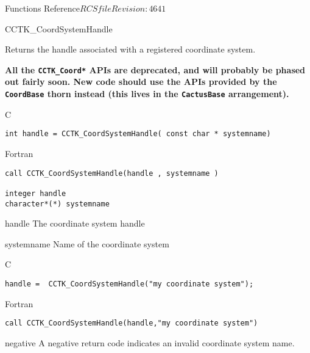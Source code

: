 \begin{cactuspart}{ Functions Reference}{$RCSfile$}{$Revision: 4641 $}
\begin{FunctionDescription}{CCTK\_CoordSystemHandle}%
{Returns the handle associated with a registered coordinate system.

\textbf{All the \texttt{CCTK\_Coord*} APIs are deprecated,
and will probably be phased out fairly soon.
New code should use the APIs provided by the \texttt{CoordBase} thorn
instead (this lives in the \texttt{CactusBase} arrangement).}
}
\label{CCTK-CoordSystemHandle}
\begin{SynopsisSection}
\begin{Synopsis}{C}
\begin{verbatim}int handle = CCTK_CoordSystemHandle( const char * systemname)\end{verbatim}
\end{Synopsis}
\begin{Synopsis}{Fortran}
\begin{verbatim}call CCTK_CoordSystemHandle(handle , systemname )

integer handle
character*(*) systemname \end{verbatim}
\end{Synopsis}
\end{SynopsisSection}
\begin{ParameterSection}
\begin{Parameter}{handle}
The coordinate system handle
\end{Parameter}
\begin{Parameter}{systemname}
Name of the coordinate system
\end{Parameter}
\end{ParameterSection}

\begin{ExampleSection}
\begin{Example}{C}
\begin{verbatim}
handle =  CCTK_CoordSystemHandle("my coordinate system");
\end{verbatim}
\end{Example}
\begin{Example}{Fortran}
\begin{verbatim}
call CCTK_CoordSystemHandle(handle,"my coordinate system")
\end{verbatim}
\end{Example}
\end{ExampleSection}
\begin{ErrorSection}
\begin{Error}{negative}
A negative return code indicates an invalid coordinate system name.
\end{Error}
\end{ErrorSection}
\end{FunctionDescription}


\end{cactuspart}
